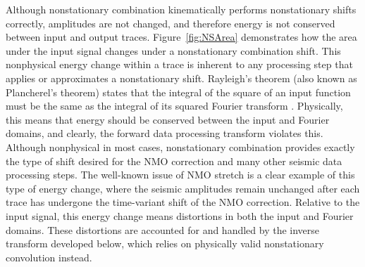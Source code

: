 Although nonstationary combination kinematically performs nonstationary shifts correctly, amplitudes are not changed, and therefore energy is not conserved between input and output traces.  
Figure~\ref{fig:NSArea} demonstrates how the area under the input signal changes under a nonstationary combination shift.
This nonphysical energy change within a trace is inherent to any processing step that applies or approximates a nonstationary shift.  
Rayleigh's theorem (also known as Plancherel's theorem) states that the integral of the square of an input function must be the same as the integral of its squared Fourier transform \cite{karl89}.
Physically, this means that energy should be conserved between the input and Fourier domains, and clearly, the forward data processing transform violates this.
Although nonphysical in most cases, nonstationary combination provides exactly the type of shift desired for the NMO correction and many other seismic data processing steps.
The well-known issue of NMO stretch \cite{barnes92} is a clear example of this type of energy change, where the seismic amplitudes remain unchanged after each trace has undergone the time-variant shift of the NMO correction.
Relative to the input signal, this energy change means distortions in both the input and Fourier domains.
These distortions are accounted for and handled by the inverse transform developed below, which relies on physically valid nonstationary convolution instead.


